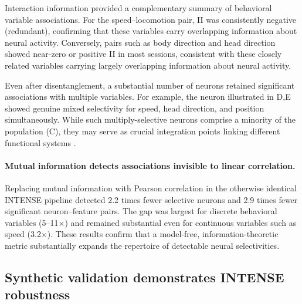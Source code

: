 Interaction information provided a complementary summary of behavioral variable associations.
For the speed--locomotion pair, II was consistently negative (redundant), confirming
that these variables carry overlapping information about neural activity.
Conversely, pairs such as body direction and head direction showed near-zero or
positive II in most sessions, consistent with these closely related variables
carrying largely overlapping information about neural activity.

Even after disentanglement, a substantial number of neurons retained significant
associations with multiple variables. For example, the neuron illustrated in
D,E showed genuine mixed selectivity for speed, head direction, and
position simultaneously. While such multiply-selective neurons comprise a minority
of the population (C), they may serve as crucial integration points
linking different functional systems \cite{mix3}.

\paragraph{Mutual information detects associations invisible to linear correlation.}
\label{sec:mi_vs_corr}
Replacing mutual information with Pearson correlation in the otherwise identical INTENSE pipeline detected 2.2 times fewer selective neurons and 2.9 times fewer significant neuron--feature pairs. The gap was largest for discrete behavioral variables (5--11$\times$) and remained substantial even for continuous variables such as speed (3.2$\times$). These results confirm that a model-free, information-theoretic metric substantially expands the repertoire of detectable neural selectivities.

\subsection{Synthetic validation demonstrates INTENSE robustness}
\label{sec:synthetic_validation}


